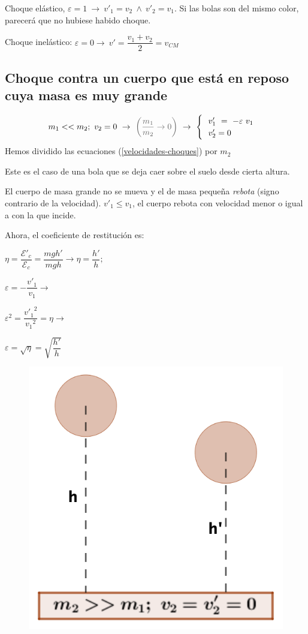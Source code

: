 Choque elástico, $\varepsilon=1 \ \to \ v'_1=v_2 \ \wedge \ v'_2=v_1$. Si las bolas son del mismo color, parecerá que no hubiese habido choque.

Choque inelástico: $\varepsilon=0 \to \ v'=\dfrac{v_1+v_2}{2}=v_{CM}$


\vspace{10mm} %
\subsection{Choque contra un cuerpo que está en reposo cuya masa es muy grande}


$$m_1<<m_2;\ v_2=0 \ \to \ \textcolor{gris}{\left( \dfrac{m_1}{m_2}\to 0 \right)} \ \to \ \begin{cases}
 \ \ v'_1\ =\ -\varepsilon \ v_1 \\ \ \  v'_2=0	
\end{cases}$$
\textcolor{gris}{ Hemos dividido las ecuaciones (\ref{velocidades-choques}) por $m_2$}

Este es el caso de una bola que se deja caer sobre el suelo desde cierta altura.

El cuerpo de masa grande no se mueva y el de masa pequeña \emph{rebota} (signo contrario de la velocidad). $v'_1 \leq v_1$, el cuerpo rebota con velocidad menor o igual a con la que incide. 

Ahora, el coeficiente de restitución es:

\begin{multicols}{2}
$\eta = \dfrac{\mathcal E'_c}{\mathcal E_c}=\dfrac{mgh'}{mgh} \to \eta=\dfrac{h'}{h};$

$\varepsilon=-\dfrac{v'_1}{v_1}\to$

$ \varepsilon^2=\dfrac{{v'_1}^2}{{v_1}^2}=\eta \to $

$\varepsilon =\sqrt{\eta}=\sqrt{\dfrac{h'}{h}}$	
\begin{figure}[H]
	\centering
	\includegraphics[width=.35\textwidth]{imagenes/imagenes17/T17IM05.png}
	\end{figure}	
\end{multicols}
	
